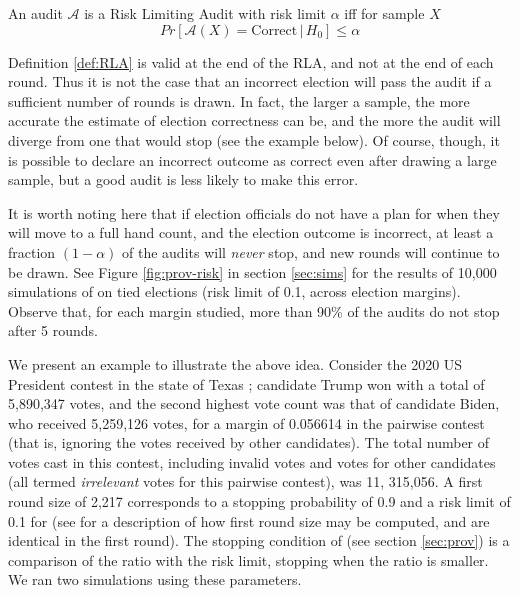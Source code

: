 \begin{definition}
\label{def:RLA}
An audit $\mathcal{A}$ is a Risk Limiting Audit with 
risk limit $\alpha$ iff for sample $X$
$$
Pr[\mathcal{A}(X) 
= \text{Correct} \,|\, H_0]\le \alpha
$$
\end{definition}

Definition \ref{def:RLA} is valid at the end of the RLA, and not at the end of each round. Thus it is not the case that an incorrect election will pass the audit if a sufficient number of rounds is drawn. In fact, the larger a sample, the more accurate the estimate of election correctness can be, and the more the audit will diverge from one that would stop (see the example below). Of course, though, it is possible to declare an incorrect outcome as correct even after drawing a large sample, but a good audit is less likely to make this error. 


 It is worth noting here that if election officials do not have a plan for when they will move to a full hand count, and the election outcome is incorrect, at least a fraction $(1-\alpha)$ of the audits will {\em never} stop, and new rounds will continue to be drawn. See Figure \ref{fig:prov-risk} in section \ref{sec:sims} for the results of 10,000 simulations of \Providence on tied elections (risk limit of 0.1, across election margins). Observe that, for each margin studied, more than 90\% of the audits do not stop after 5 rounds. 

We present an example to illustrate the above idea. Consider the 2020 US President contest in the state of Texas \cite{MIT-Data-Lab}; candidate Trump won with a total of 5,890,347 votes, and the second highest vote count was that of candidate Biden, who received 5,259,126 votes, for a margin of 0.056614 in the pairwise contest (that is, ignoring the votes received by other candidates). The total number of votes cast in this contest, including invalid votes and votes for other candidates (all termed {\em irrelevant} votes for this pairwise contest), was 11, 315,056. A first round size of 2,217 corresponds to a stopping probability of 0.9 and a risk limit of 0.1 for \Providence (see \cite{usenix_minerva} for a description of how first round size may be computed, \Minerva and \Providence are identical in the first round). The stopping condition of \Providence (see section \ref{sec:prov}) is a comparison of the \Providence ratio with the risk limit, stopping when the ratio is smaller. We ran two simulations using these parameters. 

